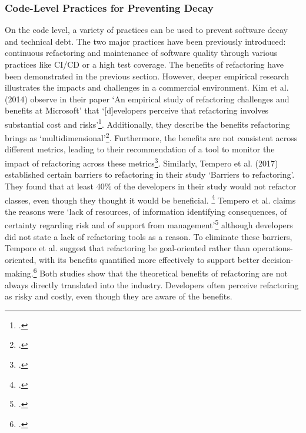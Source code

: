 \subsubsection{Code-Level Practices for Preventing Decay}
On the code level, a variety of practices can be used to prevent software decay and technical debt. The two major practices have been previously introduced: continuous refactoring and maintenance of software quality through various practices like CI/CD or a high test coverage.
The benefits of refactoring have been demonstrated in the previous section. However, deeper empirical research illustrates the impacts and challenges in a commercial environment.
Kim et al. (2014) observe in their paper `An empirical study of refactoring challenges and benefits at Microsoft' that `[d]evelopers perceive that refactoring involves substantial cost and risks'\footcite[17]{kimEmpiricalStudyRefactoring2014}.
Additionally, they describe the benefits refactoring brings as `multidimensional'\footcite[17]{kimEmpiricalStudyRefactoring2014}. Furthermore, the benefits are not consistent across different metrics, leading to their recommendation of a tool to monitor the impact of refactoring across these metrics\footcite[17]{kimEmpiricalStudyRefactoring2014}.
Similarly, Tempero et al. (2017) established certain barriers to refactoring in their study `Barriers to refactoring'. They found that at least 40\% of the developers in their study would not refactor classes, even though they thought it would be beneficial. \footcite[60]{temperoBarriersRefactoring2017}
Tempero et al. claims the reasons were `lack of resources, of information identifying consequences, of certainty regarding risk and of support from management'\footcite[60]{temperoBarriersRefactoring2017} although developers did not state a lack of refactoring tools as a reason.
To eliminate these barriers, Tempore et al. suggest that refactoring be goal-oriented rather than operations-oriented, with its benefits quantified more effectively to support better decision-making.\footcite[61]{temperoBarriersRefactoring2017}
Both studies show that the theoretical benefits of refactoring are not always directly translated into the industry. Developers often perceive refactoring as risky and costly, even though they are aware of the benefits.

